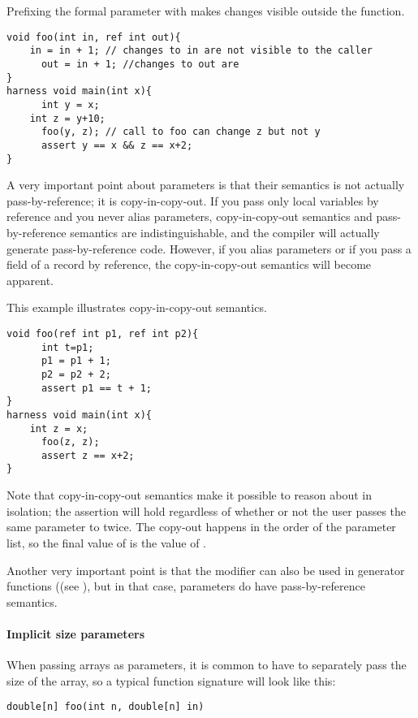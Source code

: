 \begin{Example}
Prefixing the formal parameter with  makes changes visible outside the function.
\begin{lstlisting}
void foo(int in, ref int out){
	in = in + 1; // changes to in are not visible to the caller
      out = in + 1; //changes to out are 
}
harness void main(int x){
      int y = x;
	int z = y+10;
      foo(y, z); // call to foo can change z but not y
      assert y == x && z == x+2;
}
\end{lstlisting}
\end{Example}

A very important point about  parameters is that their semantics is not actually pass-by-reference; it is copy-in-copy-out. If you pass only local variables by reference and you never alias  parameters, copy-in-copy-out semantics and pass-by-reference semantics are indistinguishable, and the compiler will actually generate pass-by-reference code. However, if you alias parameters or if you pass a field of a record by reference, the copy-in-copy-out semantics will become apparent.

\begin{Example}
This example illustrates copy-in-copy-out semantics.
\begin{lstlisting}
void foo(ref int p1, ref int p2){
      int t=p1;
      p1 = p1 + 1;
      p2 = p2 + 2;
      assert p1 == t + 1;
}
harness void main(int x){
	int z = x;
      foo(z, z); 
      assert z == x+2;
}
\end{lstlisting}
Note that copy-in-copy-out semantics make it possible to reason about  in isolation; the assertion will hold regardless of whether or not the user passes the same parameter to  twice. The copy-out happens in the order of the parameter list, so the final value of  is the value of .
\end{Example}

Another very important point is that the  modifier can also be used in generator functions ((see ), but in that case,  parameters do have pass-by-reference semantics.


\paragraph{Implicit size parameters}

When passing arrays as parameters, it is common to have to separately pass the size of the array, so a typical function signature will look like this:
\begin{lstlisting}
double[n] foo(int n, double[n] in)
\end{lstlisting}

